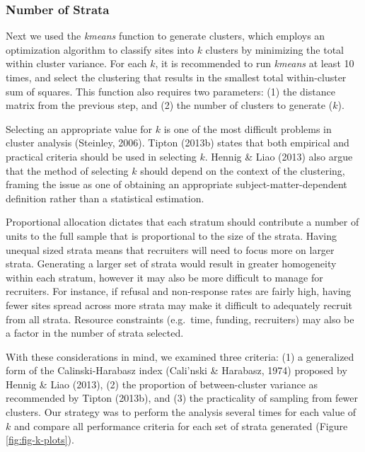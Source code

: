 \documentclass[man,floatsintext]{apa6}
\begin{document}
\hypertarget{number-of-strata}{%
\subsubsection{Number of Strata}\label{number-of-strata}}

Next we used the \emph{kmeans} function to generate clusters, which employs an optimization algorithm to classify sites into \(k\) clusters by minimizing the total within cluster variance. For each \(k\), it is recommended to run \emph{kmeans} at least 10 times, and select the clustering that results in the smallest total within-cluster sum of squares. This function also requires two parameters: (1) the distance matrix from the previous step, and (2) the number of clusters to generate (\(k\)).

Selecting an appropriate value for \(k\) is one of the most difficult problems in cluster analysis (Steinley, 2006). Tipton (2013b) states that both empirical and practical criteria should be used in selecting \(k\). Hennig \& Liao (2013) also argue that the method of selecting \(k\) should depend on the context of the clustering, framing the issue as one of obtaining an appropriate subject-matter-dependent definition rather than a statistical estimation.

Proportional allocation dictates that each stratum should contribute a number of units to the full sample that is proportional to the size of the strata. Having unequal sized strata means that recruiters will need to focus more on larger strata. Generating a larger set of strata would result in greater homogeneity within each stratum, however it may also be more difficult to manage for recruiters. For instance, if refusal and non-response rates are fairly high, having fewer sites spread across more strata may make it difficult to adequately recruit from all strata. Resource constraints (e.g.~time, funding, recruiters) may also be a factor in the number of strata selected.

With these considerations in mind, we examined three criteria: (1) a generalized form of the Calinski-Harabasz index (Cali\a'nski \& Harabasz, 1974) proposed by Hennig \& Liao (2013), (2) the proportion of between-cluster variance as recommended by Tipton (2013b), and (3) the practicality of sampling from fewer clusters. Our strategy was to perform the analysis several times for each value of \(k\) and compare all performance criteria for each set of strata generated (Figure \ref{fig:fig-k-plots}).
\end{document}

